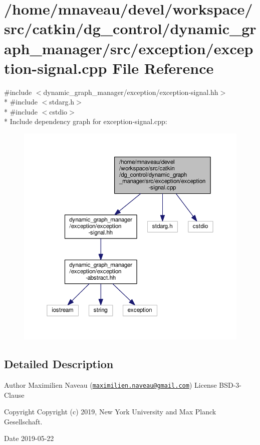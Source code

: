 \hypertarget{exception-signal_8cpp}{}\section{/home/mnaveau/devel/workspace/src/catkin/dg\+\_\+control/dynamic\+\_\+graph\+\_\+manager/src/exception/exception-\/signal.cpp File Reference}
\label{exception-signal_8cpp}
{\ttfamily \#include $<$dynamic\+\_\+graph\+\_\+manager/exception/exception-\/signal.\+hh$>$}\\*
{\ttfamily \#include $<$stdarg.\+h$>$}\\*
{\ttfamily \#include $<$cstdio$>$}\\*
Include dependency graph for exception-\/signal.cpp\+:\nopagebreak
\begin{figure}[H]
\begin{center}
\leavevmode
\includegraphics[width=350pt]{exception-signal_8cpp__incl}
\end{center}
\end{figure}


\subsection{Detailed Description}
\begin{DoxyAuthor}{Author}
Maximilien Naveau (\href{mailto:maximilien.naveau@gmail.com}{\tt maximilien.\+naveau@gmail.\+com})  License B\+S\+D-\/3-\/\+Clause 
\end{DoxyAuthor}
\begin{DoxyCopyright}{Copyright}
Copyright (c) 2019, New York University and Max Planck Gesellschaft. 
\end{DoxyCopyright}
\begin{DoxyDate}{Date}
2019-\/05-\/22 
\end{DoxyDate}
